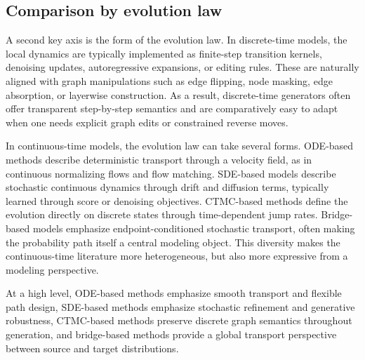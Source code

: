 \documentclass{article}
\begin{document}
\subsection{Comparison by evolution law}

A second key axis is the form of the evolution law. In discrete-time models, the local dynamics are typically implemented as finite-step transition kernels, denoising updates, autoregressive expansions, or editing rules. These are naturally aligned with graph manipulations such as edge flipping, node masking, edge absorption, or layerwise construction. As a result, discrete-time generators often offer transparent step-by-step semantics and are comparatively easy to adapt when one needs explicit graph edits or constrained reverse moves.

In continuous-time models, the evolution law can take several forms. ODE-based methods describe deterministic transport through a velocity field, as in continuous normalizing flows and flow matching. SDE-based models describe stochastic continuous dynamics through drift and diffusion terms, typically learned through score or denoising objectives. CTMC-based methods define the evolution directly on discrete states through time-dependent jump rates. Bridge-based models emphasize endpoint-conditioned stochastic transport, often making the probability path itself a central modeling object. This diversity makes the continuous-time literature more heterogeneous, but also more expressive from a modeling perspective.

At a high level, ODE-based methods emphasize smooth transport and flexible path design, SDE-based methods emphasize stochastic refinement and generative robustness, CTMC-based methods preserve discrete graph semantics throughout generation, and bridge-based methods provide a global transport perspective between source and target distributions.
\end{document}
